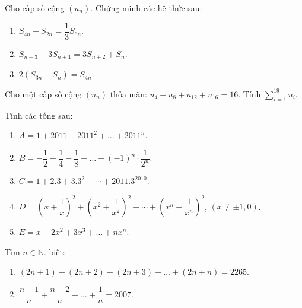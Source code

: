 \begin{bt}%
	Cho cấp số cộng $(u_n)$. Chứng minh các hệ thức sau:
	\begin{enumerate}
		\item $S_{4n}-S_{2n}=\dfrac{1}{3}S_{6n}$.
		\item $S_{n+3}+3S_{n+1}=3S_{n+2}+S_n$.
		\item $2(S_{3n}-S_{n})=S_{4n}$.
	\end{enumerate}
\end{bt}
\begin{bt}%
	Cho một cấp số cộng $(u_n)$ thỏa mãn: $u_4+u_8+u_{12}+u_{16}=16$. Tính $\sum\limits_{i=1}^{19}u_i$.
\end{bt}
\begin{bt}%
	Tính các tổng sau:
	\begin{enumerate}
		\item $A=1+2011+2011^2+\ldots+2011^n$.
		\item $B=-\dfrac{1}{2}+\dfrac{1}{4}-\dfrac{1}{8}+\ldots+(-1)^{n}\cdot\dfrac{1}{2^n}$.
		\item $C=1+2.3+3.3^2+\cdots+2011.3^{2010}$.
		\item $D=\left(x+\dfrac{1}{x}\right)^2+\left(x^2+\dfrac{1}{x^2}\right)^2+\cdots+\left(x^n+\dfrac{1}{x^n}\right)^2$, $(x\ne\pm1,0)$.
		\item $E=x+2x^2+3x^3+\ldots+nx^n$.
	\end{enumerate}
\end{bt}





\begin{bt}
	Tìm $n\in\mathbb{N}$. biết:
	\begin{enumerate}
		\item $(2n+1)+(2n+2)+(2n+3)+\ldots+(2n+n)=2265$.
		\item $\dfrac{n-1}{n}+\dfrac{n-2}{n}+\ldots+\dfrac{1}{n}=2007$.
	\end{enumerate}
\end{bt}
